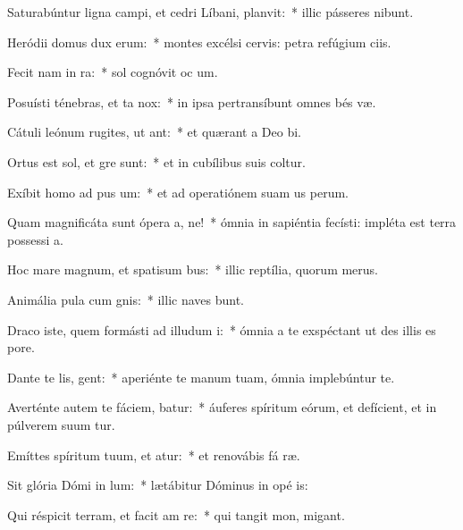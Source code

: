 \item Saturabúntur ligna campi, et cedri Líbani,  planvit:~* illic pásseres nibunt.
\item Heródii domus dux  erum:~* montes excélsi cervis: petra refúgium ciis.
\item Fecit nam in ra:~* sol cognóvit oc um.
\item Posuísti ténebras, et ta  nox:~* in ipsa pertransíbunt omnes bés væ.
\item Cátuli leónum rugites, ut ant:~* et quærant a Deo  bi.
\item Ortus est sol, et gre sunt:~* et in cubílibus suis coltur.
\item Exíbit homo ad pus um:~* et ad operatiónem suam us  perum.
\item Quam magnificáta sunt ópera a, ne!~* ómnia in sapiéntia fecísti: impléta est terra possessi a.
\item Hoc mare magnum, et spatisum bus:~* illic reptília, quorum   merus.
\item Animália pula cum gnis:~* illic naves bunt.
\item Draco iste, quem formásti ad illudum i:~* ómnia a te exspéctant ut des illis es  pore.
\item Dante te lis, gent:~* aperiénte te manum tuam, ómnia implebúntur te.
\item Averténte autem te fáciem, batur:~* áuferes spíritum eórum, et defícient, et in púlverem suum tur.
\item Emíttes spíritum tuum, et atur:~* et renovábis fá ræ.
\item Sit glória Dómi in lum:~* lætábitur Dóminus in opé is:
\item Qui réspicit terram, et facit am re:~* qui tangit mon,  migant.
